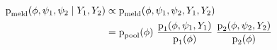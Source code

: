 \begin{align*}
  \text{p}_{\text{meld}} (\phi, \psi_{1}, \psi_{2} \mid Y_{1}, Y_{2}) &\propto
  \text{p}_{\text{meld}} (\phi, \psi_{1}, \psi_{2}, Y_{1}, Y_{2}) \\ &= 
  \text{p}_{\text{pool}}(\phi) \,\,
  \frac {
    \text{p}_{1}(\phi, \psi_{1}, Y_{1})
  } {
    \text{p}_{1}(\phi)
  }
  \,\,
  \frac {
    \text{p}_{2}(\phi, \psi_{2}, Y_{2})
  } {
    \text{p}_{2}(\phi)
  }
\end{align*}